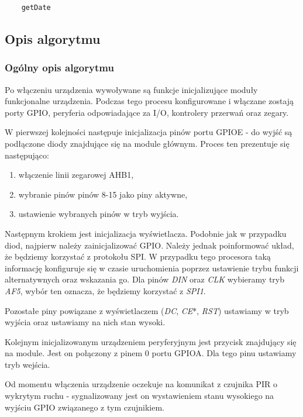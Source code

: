 \documentclass{article}
\begin{document}
\begin{lstlisting}
    getDate
\end{lstlisting}


\subsection{Opis algorytmu}

\subsubsection{Ogólny opis algorytmu}
Po włączeniu urządzenia wywoływane są funkcje inicjalizujące moduły funkcjonalne
urządzenia. Podczas tego procesu konfigurowane i włączane zostają porty GPIO,
peryferia odpowiadające za I/O, kontrolery przerwań oraz zegary.

W pierwszej kolejności następuje inicjalizacja pinów portu GPIOE - do wyjść
są podłączone diody znajdujące się na module głównym. Proces ten prezentuje się
następująco:

\begin{enumerate}
    \item włączenie linii zegarowej AHB1,
    \item wybranie pinów pinów 8-15 jako piny aktywne,
    \item ustawienie wybranych pinów w tryb wyjścia.
\end{enumerate}

Następnym krokiem jest inicjalizacja wyświetlacza. Podobnie jak w przypadku diod, najpierw
należy zainicjalizować GPIO. Należy jednak poinformować układ, że 
będziemy korzystać z protokołu SPI. W przypadku tego procesora 
taką informację konfiguruje się w czasie uruchomienia poprzez ustawienie
trybu funkcji alternatywnych oraz wskazania go.
Dla pinów \emph{DIN} oraz \emph{CLK} wybieramy tryb \emph{AF5}, wybór ten
oznacza, że będziemy korzystać z \emph{SPI1}.

Pozostałe piny powiązane z wyświetlaczem (\emph{DC}, \emph{CE}*, \emph{RST})
ustawiamy w tryb wyjścia oraz ustawiamy na nich stan wysoki.

Kolejnym inicjalizowanym urządzeniem peryferyjnym jest przycisk znajdujący
się na module. Jest on połączony z pinem 0 portu GPIOA. Dla tego pinu ustawiamy tryb
wejścia.



Od momentu włączenia urządzenie oczekuje na komunikat z czujnika PIR o wykrytym ruchu - sygnalizowany
jest on wystawieniem stanu wysokiego na wyjściu GPIO związanego z tym czujnikiem.
\end{document}
